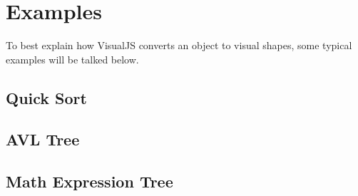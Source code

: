 \chapter {Examples}
To best explain how VisualJS converts an object to visual shapes, some typical examples will be talked below.

\section {Quick Sort}

\section {AVL Tree}

\section {Math Expression Tree}
